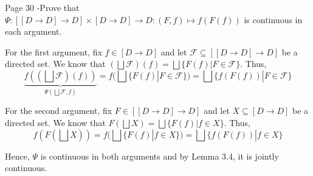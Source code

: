 \begin{problem}{Page 30}
    -Prove that $ \Psi : [[D \to D] \to D] \times [D \to D] \to D : (F,f) \mapsto f(F(f)) $
is continuous in each argument.
\end{problem}

\begin{solution}
    For the first argument, fix $f \in [D \to D]$ and let $\mathcal{F} \subseteq [[D \to D] \to D]$ be a directed set.
We know that $(\bigsqcup \mathcal{F})(f) = \bigsqcup \{ F(f) | F \in \mathcal{F} \}$.
Thus, $$  \underbrace{f((\bigsqcup \mathcal{F})(f))}_{\Psi (\bigsqcup \mathcal{F} ,f)} = f(\bigsqcup \{ F(f) | F \in \mathcal{F} \}) = \bigsqcup \{ f(F(f)) | F \in \mathcal{F} \}  $$

For the second argument, fix $F \in [[D \to D] \to D]$ and let $X \subseteq [D \to D]$ be a directed set. We know that $F(\bigsqcup X) = \bigsqcup \{ F(f) | f \in X \}$. Thus,
$$  f(F(\bigsqcup X)) = f(\bigsqcup \{F(f) | f \in X\}) = \bigsqcup \{f(F(f)) | f \in X \}  $$

Hence, $\Psi$ is continuous in both arguments and by Lemma 3.4, it is jointly continuous.
\end{solution}